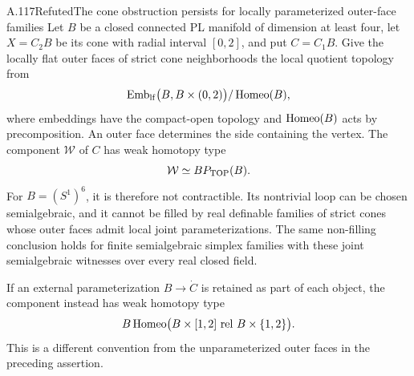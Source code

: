 \begin{saresult}{A.117}{Refuted}{The cone obstruction persists for locally parameterized outer-face families}
Let $B$ be a closed connected PL manifold of dimension at least four,
let $X=C_2B$ be its cone with radial interval $[0,2]$, and put $C=C_1B$.
Give the locally flat outer faces of strict cone neighborhoods the
local quotient topology from
\[
 \operatorname{Emb}_{\rm lf}\bigl(B,B\times(0,2)\bigr)
       /\operatorname{Homeo}(B),
\]
where embeddings have the compact-open topology and $\operatorname{Homeo}(B)$ acts
by precomposition. An outer face determines the side containing the
vertex. The component $\mathcal W$ of $C$ has weak homotopy type
\[
             \mathcal W\simeq BP_{\rm TOP}(B).
\]
For $B=(S^1)^6$, it is therefore not contractible. Its nontrivial loop
can be chosen semialgebraic, and it cannot be filled by real definable
families of strict cones whose outer faces admit local joint
parameterizations. The same non-filling conclusion holds for finite
semialgebraic simplex families with these joint semialgebraic witnesses
over every real closed field.

If an external parameterization $B\to\dot C$ is retained as part of
each object, the component instead has weak homotopy type
\[
 B\Homeo\bigl(B\times[1,2]\ \mathrm{rel}\
               B\times\{1,2\}\bigr).
\]
This is a different convention from the unparameterized outer faces
in the preceding assertion.
\end{saresult}
